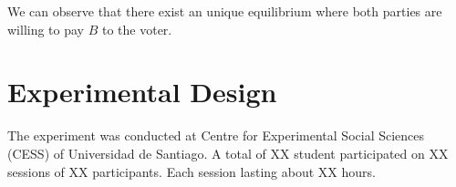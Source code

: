 \documentclass[onesided]{article}\usepackage[]{graphicx}\usepackage[]{color}
\begin{document}
We can observe that there exist an unique equilibrium where both parties are willing to pay $B$ to the voter.


\section{Experimental Design}

The experiment was conducted at Centre for Experimental Social Sciences (CESS) of Universidad de Santiago. A total of XX student participated on XX sessions of XX participants. Each session lasting about XX hours. 





\clearpage
\newpage
{}
\setcounter{page}{1}
\printbibliography
\clearpage
\newpage
\end{document}
